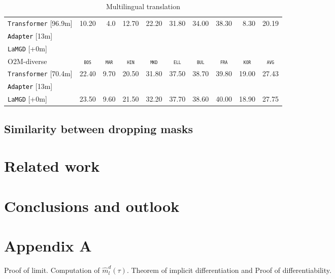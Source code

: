 \documentclass[11pt]{article}
\newcommand{\revision}[1]{\textcolor{black}{#1}}
\newcommand{\domain}[1]{\texttt{\textsc{#1}}}
\newcommand{\system}[1]{\texttt{{#1}}}
\begin{document}
\begin{table*}[ht]
\begin{tabular}{|p{4cm}|*{9}{r|}}
    \system{Transformer}  \hfill{\footnotesize[96.9m]} & 10.20&4.0&12.70&22.20&31.80&34.00&38.30&8.30&20.19 \\
    \revision{\system{Adapter}}   \hfill{\footnotesize[13m]}  & & & & & & & & & \\ 
    \system{LaMGD}   \hfill{\footnotesize[+0m]} & & & & & & & & & \\
    \hline 
    \hline
    O2M-diverse & \multicolumn{1}{c|}{\domain{bos}} & \multicolumn{1}{c|}{\domain{mar}} & \multicolumn{1}{c|}{\domain{hin}} & \multicolumn{1}{c|}{\domain{mkd}} & \multicolumn{1}{c|}{\domain{ell}} & \multicolumn{1}{c|}{\domain{bul}} & \multicolumn{1}{c|}{\domain{fra}} & \multicolumn{1}{c|}{\domain{kor}} & \multicolumn{1}{c|}{\domain{avg}} \\ \hline 
    \system{Transformer}  \hfill{\footnotesize[70.4m]} &22.40&9.70&20.50&31.80&37.50&38.70&39.80&19.00&27.43 \\
    \revision{\system{Adapter}}   \hfill{\footnotesize[13m]}  & & & & & & & & & \\ 
    \system{LaMGD}   \hfill{\footnotesize[+0m]} &23.50&9.60&21.50&32.20&37.70&38.60&40.00&18.90&27.75 \\
    \hline
  \end{tabular}
  \caption{Multilingual translation}
  \label{tab:multilingual}
\end{table*}
\subsection{Similarity between dropping masks}

\section{Related work}
\section{Conclusions and outlook}


\appendix
\section{Appendix A}
\label{appendix:a}
Proof of limit. Computation of $\hat{m}_l^d(\tau)$. Theorem of implicit differentiation and Proof of differentiability.
\end{document}

